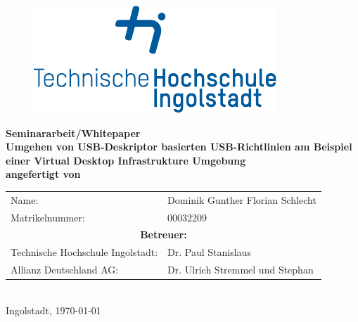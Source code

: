 
\begin{titlepage}

\phantom{tmpText}

\vspace{1cm}

\begin{figure}[h!]
\centering
\includegraphics[width=\textwidth]{bilder/thi_logo_cropped.pdf}
\end{figure}

  \begin{center}

    
    
    \textbf{{\large Seminararbeit/Whitepaper} \\[3ex]
    {\LARGE Umgehen von USB-Deskriptor basierten USB-Richtlinien am Beispiel einer Virtual Desktop Infrastrukture Umgebung} \\[1ex]
    \vfill
    angefertigt von} \\
    \begin{tabular}{ll}
    	Name: & Dominik Gunther Florian Schlecht\\
    	Matrikelnummer: & 00032209\\[2ex]
    	\multicolumn{2}{c}{\textbf{Betreuer:}}\\
    	Technische Hochschule Ingolstadt: & Dr. Paul Stanislaus \\
      Allianz Deutschland AG: & Dr. Ulrich Stremmel und Stephan
    \end{tabular}\\[2ex] %
    \vfill
    Ingolstadt, \today
  \end{center}
\end{titlepage}
